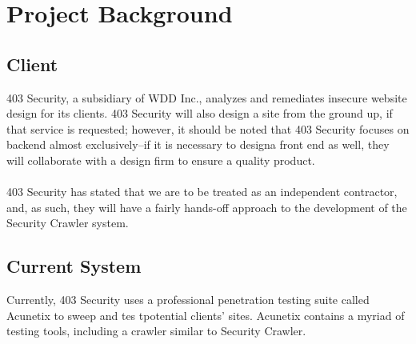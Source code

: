 \section{Project Background}
\subsection{Client}
	403 Security, a subsidiary of WDD Inc., analyzes and remediates insecure website design for its clients.  403 Security will also design a site from the ground up, if that service is requested; however, it should be noted that 403 Security focuses on backend almost exclusively--if it is necessary to designa  front end as well, they will collaborate with a design firm to ensure a quality product. \\\\
403 Security has stated that we are to be treated as an independent contractor, and, as such, they will have a fairly hands-off approach to the development of the Security Crawler system.

\subsection{Current System}

	Currently, 403 Security uses a professional penetration testing suite called Acunetix to sweep and tes tpotential clients' sites.  Acunetix contains a myriad of testing tools, including a crawler similar to Security Crawler.

